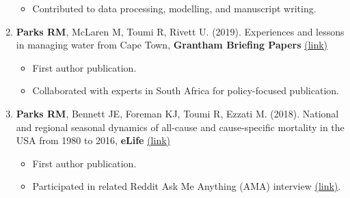 \begin{enumerate}
    \begin{itemize}
        \item Contributed to data processing, modelling, and manuscript writing.
    \end{itemize}


     \item \textbf{Parks RM}, McLaren M, Toumi R, Rivett U. (2019). Experiences and lessons in managing water from Cape Town, \textbf{Grantham Briefing Papers} \href{https://bit.ly/2Uu9oAh}{(link)} 

    \begin{itemize}
        \item First author publication.
        \item Collaborated with experts in South Africa for policy-focused publication.
    \end{itemize}



     \item \textbf{Parks RM}, Bennett JE, Foreman KJ, Toumi R, Ezzati M. (2018). National and regional seasonal dynamics of all-cause and cause-specific mortality in the USA from 1980 to 2016, \textbf{eLife}  \href{https://doi.org/10.7554/eLife.35500}{(link)} 

    \begin{itemize}
        \item First author publication.
        \item Participated in related Reddit Ask Me Anything (AMA) interview \href{https://www.reddit.com/r/IAmA/comments/9z4703/i_am_robbie_parks_a_phd_student_looking_into_how/}{(link)}.
    \end{itemize}


\end{enumerate}


